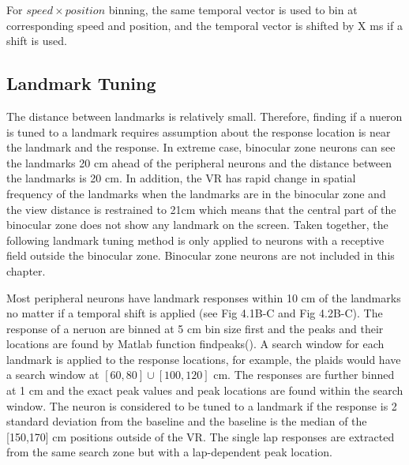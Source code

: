 For \(speed \times position \) binning, the same temporal vector is used to bin at corresponding speed and position, and the temporal vector is shifted by X ms if a shift is used.

\subsection{Landmark Tuning}
The distance between landmarks is relatively small. Therefore, finding if a nueron is tuned to a landmark requires assumption about the response location is near the landmark and the response. In extreme case, binocular zone neurons can see the landmarks 20 cm ahead of the peripheral neurons and the distance between the landmarks is 20 cm. In addition, the VR has rapid change in spatial frequency of the landmarks when the landmarks are in the binocular zone and the view distance is restrained to 21cm which means that the central part of the binocular zone does not show any landmark on the screen. Taken together, the following landmark tuning method is only applied to neurons with a receptive field outside the binocular zone. Binocular zone neurons are not included in this chapter. 

Most peripheral neurons have landmark responses within 10 cm of the landmarks no matter if a temporal shift is applied (see Fig 4.1B-C and Fig 4.2B-C). The response of a neruon are binned at 5 cm bin size first and the peaks and their locations are found by Matlab function findpeaks(). A search window for each landmark is applied to the response locations, for example, the plaids would have a search window at \([60,80] \cup [100,120]\) cm. The responses are further binned at 1 cm and the exact peak values and peak locations are found within the search window. The neuron is considered to be tuned to a landmark if the response is 2 standard deviation from the baseline and the baseline is the median of the [150,170] cm positions outside of the VR. The single lap responses are extracted from the same search zone but with a lap-dependent peak location.

